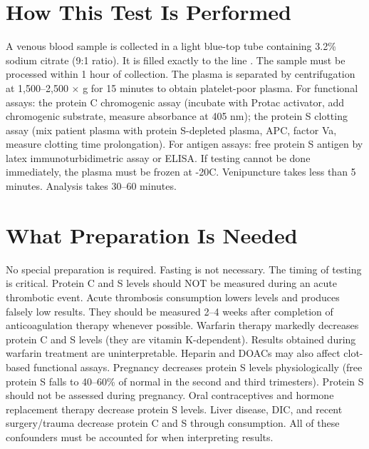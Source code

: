 \section*{How This Test Is Performed}
A venous blood sample is collected in a light blue-top tube containing 3.2\% sodium citrate (9:1 ratio). It is filled exactly to the line \cite{fischbach2023manual}. The sample must be processed within 1 hour of collection. The plasma is separated by centrifugation at 1,500--2,500 $\times$ g for 15 minutes to obtain platelet-poor plasma. For functional assays: the protein C chromogenic assay (incubate with Protac activator, add chromogenic substrate, measure absorbance at 405 nm); the protein S clotting assay (mix patient plasma with protein S-depleted plasma, APC, factor Va, measure clotting time prolongation). For antigen assays: free protein S antigen by latex immunoturbidimetric assay or ELISA. If testing cannot be done immediately, the plasma must be frozen at -20\textdegree{}C. Venipuncture takes less than 5 minutes. Analysis takes 30--60 minutes.

\section*{What Preparation Is Needed}
No special preparation is required. Fasting is not necessary. The timing of testing is critical. Protein C and S levels should NOT be measured during an acute thrombotic event. Acute thrombosis consumption lowers levels and produces falsely low results. They should be measured 2--4 weeks after completion of anticoagulation therapy whenever possible. Warfarin therapy markedly decreases protein C and S levels (they are vitamin K-dependent). Results obtained during warfarin treatment are uninterpretable. Heparin and DOACs may also affect clot-based functional assays. Pregnancy decreases protein S levels physiologically (free protein S falls to 40--60\% of normal in the second and third trimesters). Protein S should not be assessed during pregnancy. Oral contraceptives and hormone replacement therapy decrease protein S levels. Liver disease, DIC, and recent surgery/trauma decrease protein C and S through consumption. All of these confounders must be accounted for when interpreting results.

